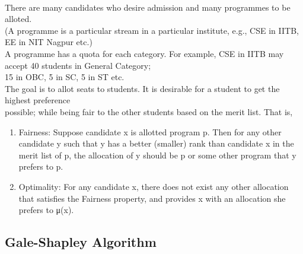 \documentclass{article}
\begin{document}
\hspace*{5 mm} \\
\hspace*{5 mm}There are many candidates who desire admission and many programmes to be alloted. \\
\hspace*{5 mm}(A programme is a particular stream in a particular institute, e.g., CSE in IITB, EE in NIT Nagpur etc.) \\
\hspace*{5 mm}A programme has a quota for each category. For example, CSE in IITB may accept 40 students in General Category; \\
\hspace*{5 mm}15 in OBC, 5 in SC, 5 in ST etc. \\
\hspace*{5 mm}The goal is to allot seats to students. It is desirable for a student to get the highest preference \\
\hspace*{5 mm}possible; while being fair to the other students based on the merit list. That is, \\
\begin{enumerate}
  \item Fairness: Suppose candidate x is allotted program p. Then for any other candidate y such that y has a better (smaller) rank than candidate x in the merit list of p, the allocation of y should be p or some other program that y prefers to p.
  \item  Optimality: For any candidate x, there does not exist any other allocation that satisfies the Fairness property, and provides x with an allocation she prefers to μ(x). 
\end{enumerate}
\pagebreak
\begin{center}
\section*{Gale-Shapley Algorithm}
\end{center}
\hspace*{5 mm} \\
\hspace*{5 mm} \\
\hspace*{5 mm} \\
\hspace*{5 mm} \\
\hspace*{5 mm}{\LARGE Initially DS allocation takes place:}
\end{document}
